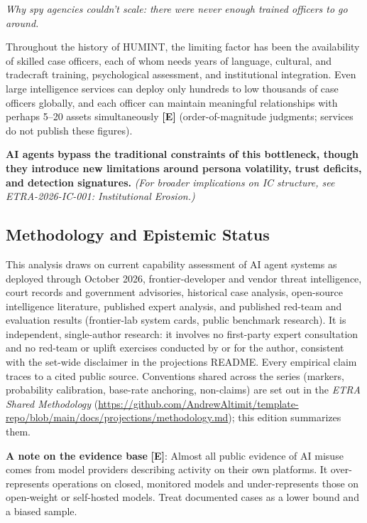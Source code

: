 \documentclass[11pt,letterpaper]{article}
\begin{document}
\textit{Why spy agencies couldn't scale: there were never enough trained officers to go around.}

Throughout the history of HUMINT, the limiting factor has been the availability of skilled case officers, each of whom needs years of language, cultural, and tradecraft training, psychological assessment, and institutional integration. Even large intelligence services can deploy only hundreds to low thousands of case officers globally, and each officer can maintain meaningful relationships with perhaps 5--20 assets simultaneously \textbf{[E]} (order-of-magnitude judgments; services do not publish these figures).

\textbf{AI agents bypass the traditional constraints of this bottleneck, though they introduce new limitations around persona volatility, trust deficits, and detection signatures.} \textit{(For broader implications on IC structure, see ETRA-2026-IC-001: Institutional Erosion.)}

\subsection{Methodology and Epistemic Status}

This analysis draws on current capability assessment of AI agent systems as deployed through October 2026, frontier-developer and vendor threat intelligence, court records and government advisories, historical case analysis, open-source intelligence literature, published expert analysis, and published red-team and evaluation results (frontier-lab system cards, public benchmark research). It is independent, single-author research: it involves no first-party expert consultation and no red-team or uplift exercises conducted by or for the author, consistent with the set-wide disclaimer in the projections README. Every empirical claim traces to a cited public source. Conventions shared across the series (markers, probability calibration, base-rate anchoring, non-claims) are set out in the \textit{ETRA Shared Methodology} (\url{https://github.com/AndrewAltimit/template-repo/blob/main/docs/projections/methodology.md}); this edition summarizes them.

\textbf{A note on the evidence base} \textbf{[E]}: Almost all public evidence of AI misuse comes from model providers describing activity on their own platforms. It over-represents operations on closed, monitored models and under-represents those on open-weight or self-hosted models. Treat documented cases as a lower bound and a biased sample.
\end{document}

